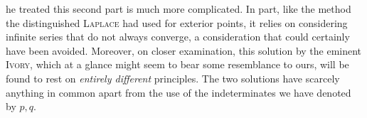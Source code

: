 he treated this second part is much more complicated. In part, like the method the distinguished \textsc{Laplace} had used for exterior points, it relies on considering infinite series that do not always converge, a consideration that could certainly have been avoided. Moreover, on closer examination, this solution by the eminent \textsc{Ivory}, which at a glance might seem to bear some resemblance to ours, will be found to rest on \textit{entirely different} principles. The two solutions have scarcely anything in common apart from the use of the indeterminates we have denoted by $p,q$.
